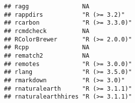 \documentclass[
]{article}
\begin{document}
\begin{verbatim}
## ragg               NA                                                                                                                                                                                                    
## rappdirs           "R (>= 3.2)"                                                                                                                                                                                          
## rcarbon            "R (>= 3.3.0)"                                                                                                                                                                                        
## rcmdcheck          NA                                                                                                                                                                                                    
## RColorBrewer       "R (>= 2.0.0)"                                                                                                                                                                                        
## Rcpp               NA                                                                                                                                                                                                    
## rematch2           NA                                                                                                                                                                                                    
## remotes            "R (>= 3.0.0)"                                                                                                                                                                                        
## rlang              "R (>= 3.5.0)"                                                                                                                                                                                        
## rmarkdown          "R (>= 3.0)"                                                                                                                                                                                          
## rnaturalearth      "R (>= 3.1.1)"                                                                                                                                                                                        
## rnaturalearthhires "R (>= 3.1.1)"                                                                                                                                                                                        

\end{verbatim}
\end{document}
